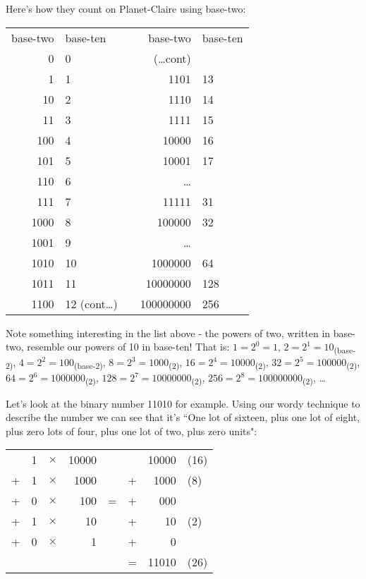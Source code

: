 \documentclass{article}
\begin{document}
Here's how they count on Planet-Claire using base-two:
\begin{center}
\begin{tabular}{r l c r l}
base-two & base-ten  & \; \; \; \; & base-two & base-ten\\
0 & 0  & \phantom& (\dots cont)\\
1 & 1  & \phantom& 1101 & 13\\
10 & 2  & \phantom& 1110 & 14\\
11 & 3  & \phantom& 1111 & 15\\
100 & 4  & \phantom& 10000 & 16\\
101 & 5  & \phantom& 10001 & 17\\
110 & 6  & \phantom& \dots{}\\
111 & 7  & \phantom& 11111 & 31\\
1000 & 8  & \phantom& 100000 & 32\\
1001 & 9  & \phantom& \dots{}\\
1010 & 10 & \phantom & 1000000 & 64\\
1011 & 11  & \phantom& 10000000 & 128\\
1100 & 12 (cont\dots)  & \phantom& 100000000 & 256\\
\end{tabular}
\end{center}

Note something interesting in the list above - the powers of two,
written in base-two,
resemble our powers of 10 in base-ten! That is:
$1=2^0=1$,
$2=2^1=10$\textsubscript{(base-2)},
$4=2^2=100$\textsubscript{(base-2)},
$8=2^3=1000$\textsubscript{(2)},
$16=2^4=10000$\textsubscript{(2)},
$32=2^5=100000$\textsubscript{(2)},
$64=2^6=1000000$\textsubscript{(2)},
$128=2^7=10000000$\textsubscript{(2)},
$256=2^8=100000000$\textsubscript{(2)},
\dots{}

Let's look at the binary number 11010 for example.
Using our wordy technique to describe the number
we can see that it's ``One lot of sixteen,
plus one lot of eight, plus zero lots of four,
plus one lot of two, plus zero units": 

\begin{center}
\begin{tabular}{r r r r c r r l}
\phantom  & 1 & $\times$ & 10000 & \phantom & \phantom & 10000 & (16)\\
+ & 1 & $\times$ & 1000  & \phantom & + & 1000 & (8)\\
+ & 0 & $\times$ & 100 & \; \; = \; \; & + & 000 & \\
+ & 1 & $\times$ & 10 & \phantom & + & 10 & (2)\\
+ & 0 & $\times$ & 1 & \phantom & + & 0\\
\cline{6-8}
\phantom & \phantom & \phantom & \phantom & \phantom & = & 11010 & (26)\\
\end{tabular}
\end{center}
\end{document}
